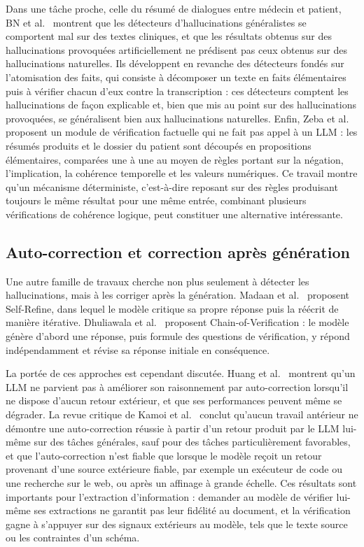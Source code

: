 Dans une tâche proche, celle du résumé de dialogues entre médecin et patient, BN et al.~\cite{bn2025fact} montrent que les détecteurs d'hallucinations généralistes se comportent mal sur des textes cliniques, et que les résultats obtenus sur des hallucinations provoquées artificiellement ne prédisent pas ceux obtenus sur des hallucinations naturelles. Ils développent en revanche des détecteurs fondés sur l'atomisation des faits, qui consiste à décomposer un texte en faits élémentaires puis à vérifier chacun d'eux contre la transcription : ces détecteurs comptent les hallucinations de façon explicable et, bien que mis au point sur des hallucinations provoquées, se généralisent bien aux hallucinations naturelles. Enfin, Zeba et al.~\cite{zeba2026mitigating} proposent un module de vérification factuelle qui ne fait pas appel à un LLM : les résumés produits et le dossier du patient sont découpés en propositions élémentaires, comparées une à une au moyen de règles portant sur la négation, l'implication, la cohérence temporelle et les valeurs numériques. Ce travail montre qu'un mécanisme déterministe, c'est-à-dire reposant sur des règles produisant toujours le même résultat pour une même entrée, combinant plusieurs vérifications de cohérence logique, peut constituer une alternative intéressante.

\subsection{Auto-correction et correction après génération}

Une autre famille de travaux cherche non plus seulement à détecter les hallucinations, mais à les corriger après la génération. Madaan et al.~\cite{madaan2023selfrefine} proposent Self-Refine, dans lequel le modèle critique sa propre réponse puis la réécrit de manière itérative. Dhuliawala et al.~\cite{dhuliawala2024cove} proposent Chain-of-Verification : le modèle génère d'abord une réponse, puis formule des questions de vérification, y répond indépendamment et révise sa réponse initiale en conséquence.

La portée de ces approches est cependant discutée. Huang et al.~\cite{huang2024cannot} montrent qu'un LLM ne parvient pas à améliorer son raisonnement par auto-correction lorsqu'il ne dispose d'aucun retour extérieur, et que ses performances peuvent même se dégrader. La revue critique de Kamoi et al.~\cite{kamoi2024selfcorrection} conclut qu'aucun travail antérieur ne démontre une auto-correction réussie à partir d'un retour produit par le LLM lui-même sur des tâches générales, sauf pour des tâches particulièrement favorables, et que l'auto-correction n'est fiable que lorsque le modèle reçoit un retour provenant d'une source extérieure fiable, par exemple un exécuteur de code ou une recherche sur le web, ou après un affinage à grande échelle. Ces résultats sont importants pour l'extraction d'information : demander au modèle de vérifier lui-même ses extractions ne garantit pas leur fidélité au document, et la vérification gagne à s'appuyer sur des signaux extérieurs au modèle, tels que le texte source ou les contraintes d'un schéma.

